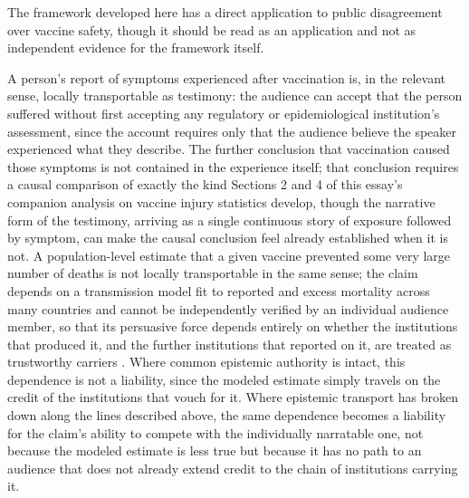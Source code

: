 \documentclass[11pt]{article}
\begin{document}
The framework developed here has a direct application to public disagreement over vaccine safety, though it should be read as an application and not as independent evidence for the framework itself.

A person's report of symptoms experienced after vaccination is, in the relevant sense, locally transportable as testimony: the audience can accept that the person suffered without first accepting any regulatory or epidemiological institution's assessment, since the account requires only that the audience believe the speaker experienced what they describe. The further conclusion that vaccination caused those symptoms is not contained in the experience itself; that conclusion requires a causal comparison of exactly the kind Sections 2 and 4 of this essay's companion analysis on vaccine injury statistics develop, though the narrative form of the testimony, arriving as a single continuous story of exposure followed by symptom, can make the causal conclusion feel already established when it is not. A population-level estimate that a given vaccine prevented some very large number of deaths is not locally transportable in the same sense; the claim depends on a transmission model fit to reported and excess mortality across many countries and cannot be independently verified by an individual audience member, so that its persuasive force depends entirely on whether the institutions that produced it, and the further institutions that reported on it, are treated as trustworthy carriers \citep{watson2022}. Where common epistemic authority is intact, this dependence is not a liability, since the modeled estimate simply travels on the credit of the institutions that vouch for it. Where epistemic transport has broken down along the lines described above, the same dependence becomes a liability for the claim's ability to compete with the individually narratable one, not because the modeled estimate is less true but because it has no path to an audience that does not already extend credit to the chain of institutions carrying it.
\end{document}
